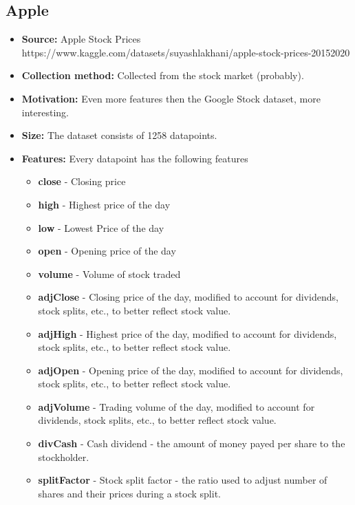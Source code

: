 \subsection{Apple}
\begin{itemize}
	\item \textbf{Source:} Apple Stock Prices \\ https://www.kaggle.com/datasets/suyashlakhani/apple-stock-prices-20152020
	\item \textbf{Collection method:} Collected from the stock market (probably).
	\item \textbf{Motivation:} Even more features then the Google Stock dataset, more interesting.
	\item \textbf{Size:} The dataset consists of 1258 datapoints.
	\item \textbf{Features:} Every datapoint has the following features
	      \begin{itemize}
		      \item \textbf{close} - Closing price
		      \item \textbf{high} - Highest price of the day
		      \item \textbf{low} - Lowest Price of the day
		      \item \textbf{open} - Opening price of the day
		      \item \textbf{volume} - Volume of stock traded
		      \item \textbf{adjClose} - Closing price of the day, modified to account for dividends, stock splits, etc., to better reflect stock value.
		      \item \textbf{adjHigh} - Highest price of the day, modified to account for dividends, stock splits, etc., to better reflect stock value.
		      \item \textbf{adjOpen} - Opening price of the day, modified to account for dividends, stock splits, etc., to better reflect stock value.
		      \item \textbf{adjVolume} - Trading volume of the day, modified to account for dividends, stock splits, etc., to better reflect stock value.
		      \item \textbf{divCash} - Cash dividend - the amount of money payed per share to the stockholder.
		      \item \textbf{splitFactor} - Stock split factor - the ratio used to adjust number of shares and their prices during a stock split.
	      \end{itemize}
\end{itemize}
